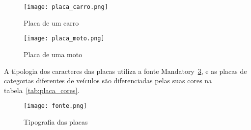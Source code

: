 \begin{figure}[H]
		\centering
		\texttt{[image: placa\_carro.png]}
		\caption{Placa de um carro}
		\label{fig:placa_carro}
\end{figure}

\begin{figure}[H]
		\centering
		\texttt{[image: placa\_moto.png]}
		\caption{Placa de uma moto}
		\label{fig:placa_moto}
\end{figure}

A tipologia dos caracteres das placas utiliza a fonte
Mandatory~\ref{fig:tipografia}, e as placas de categorias diferentes de veículos
são diferenciadas pelas suas cores na tabela~\ref{tab:placa_cores}.

\begin{figure}[H]
		\centering
		\texttt{[image: fonte.png]}
		\caption{Tipografia das placas}
		\label{fig:tipografia}
\end{figure}

